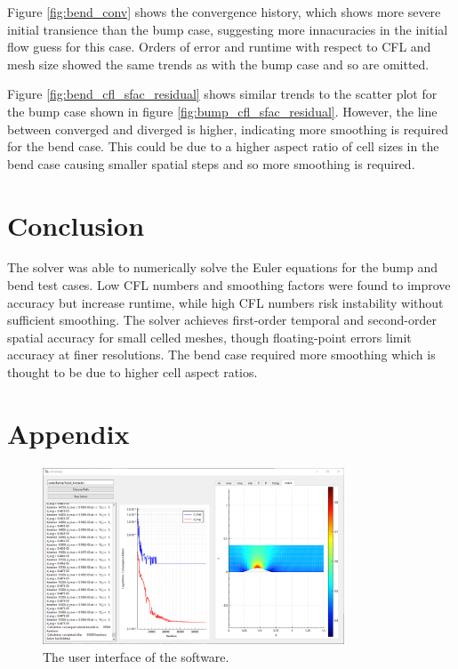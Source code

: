 \documentclass{article}
\begin{document}
Figure \ref{fig:bend_conv} shows the convergence history, which shows more severe initial transience than the bump case, suggesting more innacuracies in the initial flow guess for this case.
Orders of error and runtime with respect to CFL and mesh size showed the same trends as with the bump case and so are omitted.

Figure \ref{fig:bend_cfl_sfac_residual} shows similar trends to the scatter plot for the bump case shown in figure \ref{fig:bump_cfl_sfac_residual}.
However, the line between converged and diverged is higher, indicating more smoothing is required for the bend case.
This could be due to a higher aspect ratio of cell sizes in the bend case causing smaller spatial steps and so more smoothing is required.


\section{Conclusion}

The solver was able to numerically solve the Euler equations for the bump and bend test cases.
Low CFL numbers and smoothing factors were found to improve accuracy but increase runtime, while high CFL numbers risk instability without sufficient smoothing.
The solver achieves first-order temporal and second-order spatial accuracy for small celled meshes,
though floating-point errors limit accuracy at finer resolutions. 
The bend case required more smoothing which is thought to be due to higher cell aspect ratios.

\section{Appendix}

\begin{figure}[H]
    \centering
    \includegraphics[width=0.8\textwidth]{figures/software.png}
    \caption{The user interface of the software.}
    \label{fig:ui}
\end{figure}
\end{document}
